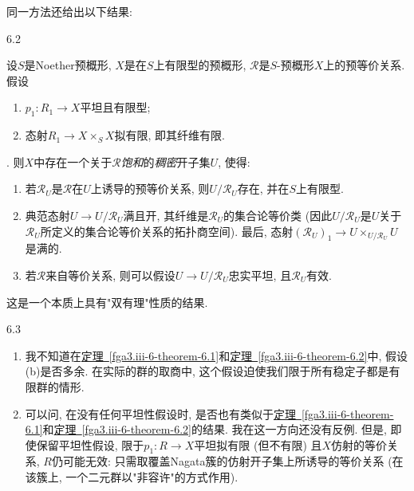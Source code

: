\par{}同一方法还给出以下结果:
\begin{theorem}{6.2}\label{fga3.iii-6-theorem-6.2}\skipsinglepar
\par{}设\(S\)是Noether预概形, \(X\)是在\(S\)上有限型的预概形, \(\mathcal {R}\)是\(S\)-预概形\(X\)上的预等价关系. 假设
\begin{enumerate}
      
 \item[a.]\(p_1\colon  R_1\to  X\)平坦且有限型;

      
 \item[b.]态射\(R_1\to  X\times _S X\)拟有限, 即其纤维有限.

    
\end{enumerate}. 则\(X\)中存在一个关于\(\mathcal {R}\)\emph{饱和}的\emph{稠密}开子集\(U\), 使得: 
\begin{enumerate}
      
 \item[i.]若\(\mathcal {R}_U\)是\(\mathcal {R}\)在\(U\)上诱导的预等价关系, 则\(U/\mathcal {R}_U\)存在, 并在\(S\)上有限型.

      
 \item[ii.]典范态射\(U\to  U/\mathcal {R}_U\)满且开, 其纤维是\(\mathcal {R}_U\)的集合论等价类 (因此\(U/\mathcal {R}_U\)是\(U\)关于\(\mathcal {R}_U\)所定义的集合论等价关系的拓扑商空间). 最后, 态射\((\mathcal {R}_U)_1\to  U\times _{U/\mathcal {R}_U}U\)是满的.

      
 \item[iii.]若\(\mathcal {R}\)来自等价关系, 则可以假设\(U\to  U/\mathcal {R}_U\)忠实平坦, 且\(\mathcal {R}_U\)有效.

    
\end{enumerate}
\end{theorem}
\par{}这是一个本质上具有"双有理"性质的结果.
\begin{remarks}{6.3}\label{fga3.iii-6-remarks-6.3}\skipsinglepar
\begin{enumerate}\item{}我不知道在\hyperref[fga3.iii-6-theorem-6.1]{定理~\ref*{fga3.iii-6-theorem-6.1}}和\hyperref[fga3.iii-6-theorem-6.2]{定理~\ref*{fga3.iii-6-theorem-6.2}}中, 假设(b)是否多余. 在实际的群的取商中, 这个假设迫使我们限于所有稳定子都是有限群的情形.

    \item{}可以问, 在没有任何平坦性假设时, 是否也有类似于\hyperref[fga3.iii-6-theorem-6.1]{定理~\ref*{fga3.iii-6-theorem-6.1}}和\hyperref[fga3.iii-6-theorem-6.2]{定理~\ref*{fga3.iii-6-theorem-6.2}}的结果. 我在这一方向还没有反例. 但是, 即使保留平坦性假设, 限于\(p_1\colon  R\to  X\)平坦拟有限 (但不有限) 且\(X\)仿射的等价关系, \(R\)仍可能无效: 只需取覆盖Nagata簇的仿射开子集上所诱导的等价关系 (在该簇上, 一个二元群以"非容许"的方式作用).
\end{enumerate}
\end{remarks}
